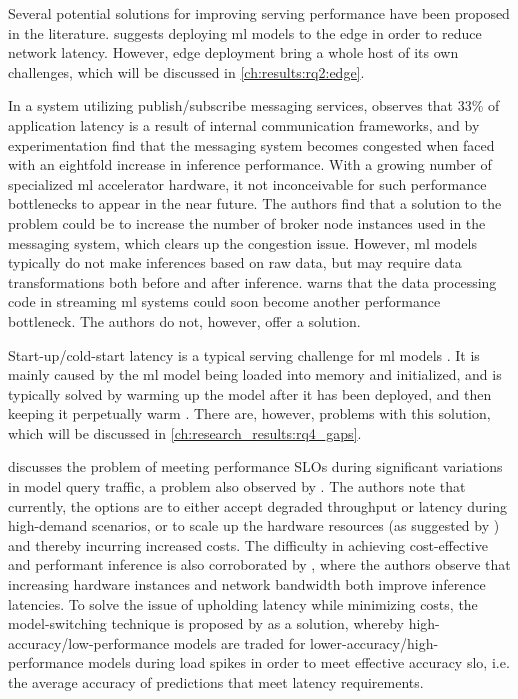 Several potential solutions for improving serving performance have been proposed in the literature.
\textcite{Gupta2020} suggests deploying \acrshort{ml} models to the edge in order to reduce network latency. However, edge deployment bring a whole host of its own challenges, which will be discussed in \cref{ch:results:rq2:edge}.

In a system utilizing publish/subscribe messaging services, \cite{Richins2020} observes that 33\% of application latency is a result of internal communication frameworks, and by experimentation find that the messaging system becomes congested when faced with an eightfold increase in inference performance.
With a growing number of specialized \acrshort{ml} accelerator hardware, it not inconceivable for such performance bottlenecks to appear in the near future.
The authors find that a solution to the problem could be to increase the number of broker node instances used in the messaging system, which clears up the congestion issue. 
However, \acrshort{ml} models typically do not make inferences based on raw data, but may require data transformations both before and after inference.
\cite{Richins2020} warns that the data processing code in streaming \acrshort{ml} systems could soon become another performance bottleneck.
The authors do not, however, offer a solution.

Start-up/cold-start latency is a typical serving challenge for \acrshort{ml} models \cite{Yadwadkar2019}. It is mainly caused by the \acrshort{ml} model being loaded into memory and initialized, and is typically solved by warming up the model after it has been deployed, and then keeping it perpetually warm \cite{Zhang2020}.
There are, however, problems with this solution, which will be discussed in \cref{ch:research_results:rq4_gaps}.

\cite{Zhang2020} discusses the problem of meeting performance SLOs during significant variations in model query traffic, a problem also observed by \cite{Yadwadkar2019}.
The authors note that currently, the options are to either accept degraded throughput or latency during high-demand scenarios, or to scale up the hardware resources (as suggested by \cite{Bernardi2019}) and thereby incurring increased costs.
The difficulty in achieving cost-effective and performant inference is also corroborated by \cite{Chahal2020}, where the authors observe that increasing hardware instances and network bandwidth both improve inference latencies.
To solve the issue of upholding latency  while minimizing costs, the model-switching technique is proposed by \cite{Zhang2020} as a solution, whereby high-accuracy/low-performance models are traded for lower-accuracy/high-performance models during load spikes in order to meet effective accuracy \acrshort{slo}, i.e. the average accuracy of predictions that meet latency requirements.


